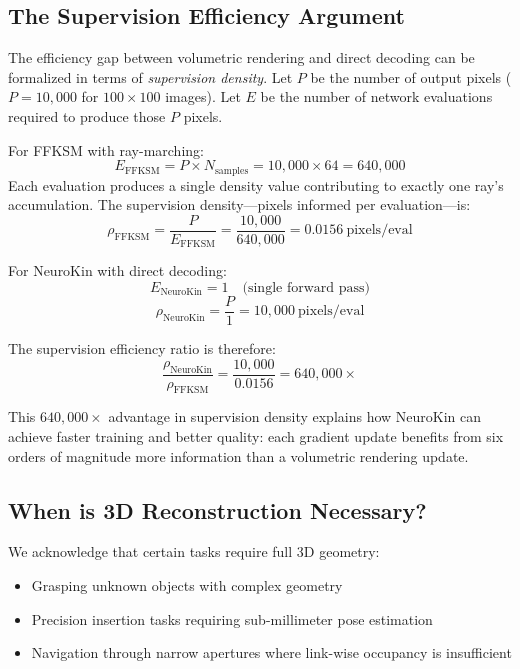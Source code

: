 \documentclass[12pt,a4paper,oneside]{report}
\begin{document}
\subsection{The Supervision Efficiency Argument}

The efficiency gap between volumetric rendering and direct decoding can be formalized in terms of \textit{supervision density}. Let $P$ be the number of output pixels ($P = 10,000$ for $100 \times 100$ images). Let $E$ be the number of network evaluations required to produce those $P$ pixels.

For FFKSM with ray-marching:
\begin{equation}
E_{\text{FFKSM}} = P \times N_{\text{samples}} = 10,000 \times 64 = 640,000
\end{equation}
Each evaluation produces a single density value contributing to exactly one ray's accumulation. The supervision density---pixels informed per evaluation---is:
\begin{equation}
\rho_{\text{FFKSM}} = \frac{P}{E_{\text{FFKSM}}} = \frac{10,000}{640,000} = 0.0156\ \text{pixels/eval}
\end{equation}

For NeuroKin with direct decoding:
\begin{equation}
E_{\text{NeuroKin}} = 1 \quad \text{(single forward pass)}
\end{equation}
\begin{equation}
\rho_{\text{NeuroKin}} = \frac{P}{1} = 10,000\ \text{pixels/eval}
\end{equation}

The supervision efficiency ratio is therefore:
\begin{equation}
\frac{\rho_{\text{NeuroKin}}}{\rho_{\text{FFKSM}}} = \frac{10,000}{0.0156} = 640,000\times
\end{equation}

This $640,000\times$ advantage in supervision density explains how NeuroKin can achieve faster training and better quality: each gradient update benefits from six orders of magnitude more information than a volumetric rendering update.

\subsection{When is 3D Reconstruction Necessary?}

We acknowledge that certain tasks require full 3D geometry:
\begin{itemize}
    \item Grasping unknown objects with complex geometry
    \item Precision insertion tasks requiring sub-millimeter pose estimation
    \item Navigation through narrow apertures where link-wise occupancy is insufficient
\end{itemize}
\end{document}
